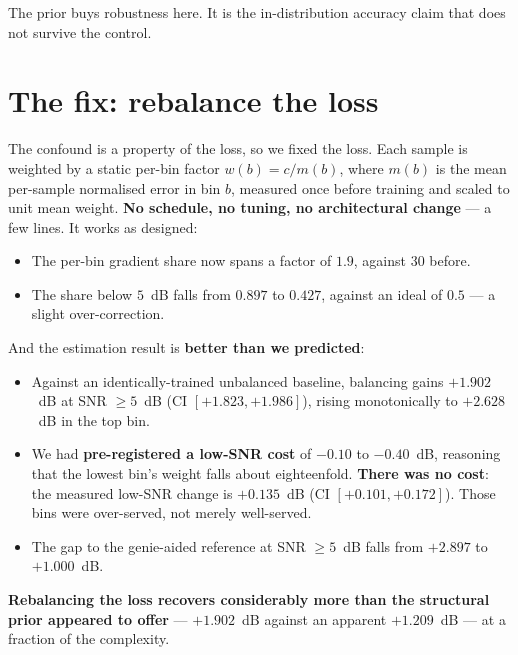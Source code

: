 \documentclass[11pt]{article}
\begin{document}
The prior buys robustness here. It is the in-distribution accuracy claim that
does not survive the control.

\section{The fix: rebalance the loss}

The confound is a property of the loss, so we fixed the loss. Each sample is
weighted by a static per-bin factor $w(b)=c/m(b)$, where $m(b)$ is the mean
per-sample normalised error in bin $b$, measured once before training and
scaled to unit mean weight. \textbf{No schedule, no tuning, no architectural
change} --- a few lines. It works as designed:

\begin{itemize}
\item The per-bin gradient share now spans a factor of $1.9$, against $30$
before.
\item The share below $5$~dB falls from $0.897$ to $0.427$, against an ideal of
$0.5$ --- a slight over-correction.
\end{itemize}

And the estimation result is \textbf{better than we predicted}:

\begin{itemize}
\item Against an identically-trained unbalanced baseline, balancing gains
$+1.902$~dB at SNR $\ge5$~dB (CI $[+1.823,+1.986]$), rising monotonically to
$+2.628$~dB in the top bin.
\item We had \textbf{pre-registered a low-SNR cost} of $-0.10$ to $-0.40$~dB,
reasoning that the lowest bin's weight falls about eighteenfold. \textbf{There
was no cost}: the measured low-SNR change is $+0.135$~dB (CI
$[+0.101,+0.172]$). Those bins were over-served, not merely well-served.
\item The gap to the genie-aided reference at SNR $\ge5$~dB falls from
$+2.897$ to $+1.000$~dB.
\end{itemize}

\textbf{Rebalancing the loss recovers considerably more than the structural
prior appeared to offer} --- $+1.902$~dB against an apparent $+1.209$~dB --- at
a fraction of the complexity.
\end{document}

